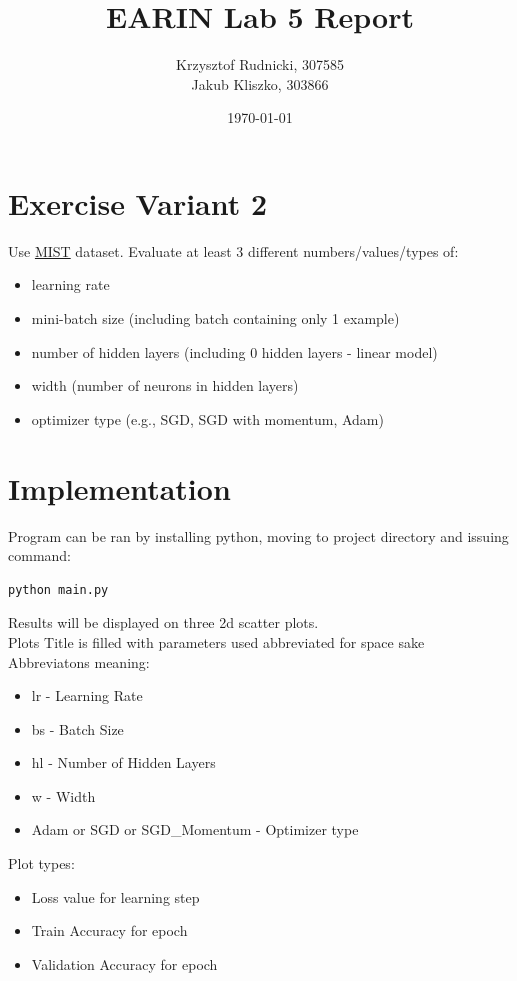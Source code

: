 \documentclass{article}[12pt]
\title{EARIN Lab 5 Report}
\author{Krzysztof Rudnicki, 307585 \\ Jakub Kliszko, 303866  }
\date{\today}
\begin{document}
\maketitle

\section{Exercise Variant 2}
Use \href{https://pytorch.org/vision/stable/generated/torchvision.datasets.MNIST.html#torchvision.datasets.MNIST}{MIST} dataset. Evaluate at least 3 different numbers/values/types of:
\begin{itemize}
    \item learning rate
    \item mini-batch size (including batch containing only 1 example)
    \item number of hidden layers (including 0 hidden layers - linear model)
    \item width (number of neurons in hidden layers)
    \item optimizer type (e.g., SGD, SGD with momentum, Adam)
\end{itemize}

\section{Implementation}
Program can be ran by installing python, moving to project directory and issuing command:
\begin{lstlisting}[language=bash]
python main.py
\end{lstlisting}
Results will be displayed on three 2d scatter plots. \\ 
Plots Title is filled with parameters used abbreviated for space sake \\ 
Abbreviatons meaning: 
\begin{itemize} 
    \item lr - Learning Rate
    \item bs - Batch Size 
    \item hl - Number of Hidden Layers 
    \item w - Width 
    \item Adam or SGD or SGD\_Momentum - Optimizer type
\end{itemize}
Plot types: 
\begin{itemize}
    \item Loss value for learning step
    \item Train Accuracy for epoch
    \item Validation Accuracy for epoch
\end{itemize}
\end{document}
